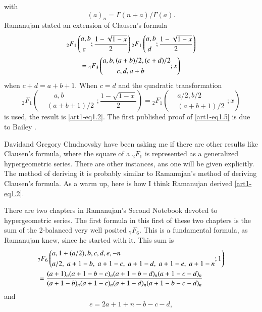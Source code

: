 with 
\begin{equation}
(a)_n = \Gamma (n+a) / \Gamma (a). \label{art1-eq1.4}
\end{equation}
Ramanujan \cite{art1-key11} stated an extension of Clausen's formula
\begin{gather}
{}_2 F_1 \left(
\begin{aligned}
& a, b\\
& ~ c
\end{aligned};
\frac{1 - \sqrt{1-x}}{2} \right) {}_2 F_1 
\left(
\begin{aligned}
& a, b\\
& ~ d
\end{aligned} ; 
\frac{1-\sqrt{1-x}}{2}
 \right) \label{art1-eq1.5}\\
= {}_4 F_3 
\left(
\begin{aligned}
&a, b, (a+b) / 2, (c+ d) / 2\\
& \qquad c, d, a + b
\end{aligned};x \right)
\notag
\end{gather}
when $c+ d = a+ b +1$. When $c =d$ and the quadratic transformation
$$
{}_2 F_1 \left(
\begin{aligned}
& \quad a, b\\
& (a+b+1)/2 
\end{aligned}; \frac{1-\sqrt{1-x}}{2}
 \right) = {}_2 F_1 
\left(
\begin{aligned}
& a/2, b/2\\
& (a+b+1)/2
\end{aligned}; x
\right)
$$
is used, the result is \eqref{art1-eq1.2}. The first published proof of \eqref{art1-eq1.5} is due to Bailey \cite{art1-key1}.

David\pageoriginale and Gregory Chudnovsky have been asking me if there are other results like Clausen's formula, where the square of a ${}_2 F_1$ is represented as a generalized hypergeometric series. There are other instances, ans one will be given explicitly. The method of deriving it is probably similar to Ramanujan's method of deriving Clausen's formula. As a warm up, here is how I think Ramanujan derived \eqref{art1-eq1.2}.

There are two chapters in Ramanujan's Second Notebook devoted to hypergeometric series. The first formula in this first of these two chapters is the sum of the 2-balanced very well posited ${}_7 F_6$. This is a fundamental formula, as Ramanujan knew, since he started with it. This sum is
\begin{align}
& {}_7 F_6 \left(
\begin{aligned}
& a, 1 + (a/2), b, c, d, e, -n\\
& a/2, \;a+1-b, \;a+1-c, \;a+1-d, \;a+1-e, \;a + 1 -n
\end{aligned};1
\right) \label{art1-eq1.6}\\
& =
\frac{(a+1)_n (a+1-b-c)_n (a+1-b-d)_n(a+1-c-d)_n}{(a+1-b)_n (a+1-c)_n (a+1-d)_n (a+1-b-c-d)_n} \notag
\end{align}
and
\begin{equation}
e = 2 a + 1 + n - b - c -d ,  \label{art1-eq1.7}
\end{equation}

